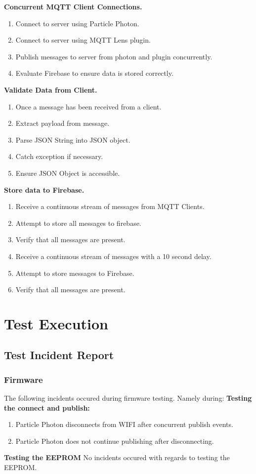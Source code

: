 \documentclass[a4paper,10pt]{article}
\begin{document}
		\textbf{Concurrent MQTT Client Connections.}
		\begin{enumerate}
			\item Connect to server using Particle Photon.
			\item Connect to server using MQTT Lens plugin.
			\item Publish messages to server from photon and plugin concurrently.
			\item Evaluate Firebase to ensure data is stored correctly.
		\end{enumerate}
		\textbf{Validate Data from Client.}
		\begin{enumerate}
			\item Once a message has been received from a client.
			\item Extract payload from message.
			\item Parse JSON String into JSON object.
			\item Catch exception if necessary.
			\item Ensure JSON Object is accessible.
		\end{enumerate}
		\textbf{Store data to Firebase.}
		\begin{enumerate}
			\item Receive a continuous stream of messages from MQTT Clients.
			\item Attempt to store all messages to firebase.
			\item Verify that all messages are present.
			\item Receive a continuous stream of messages with a 10 second delay.
			\item Attempt to store messages to Firebase.
			\item Verify that all messages are present.
		\end{enumerate}
			
	\section{Test Execution}
		\subsection{Test Incident Report}
			\subsubsection{Firmware}
			The following incidents occured during firmware testing. Namely during:
			\textbf{Testing the connect and publish:}
				\begin{enumerate}
					\item Particle Photon disconnects from WIFI after concurrent publish events.
					\item Particle Photon does not continue publishing after disconnecting.
				\end{enumerate}
			\textbf{Testing the EEPROM}
			No incidents occured with regards to testing the EEPROM.
\end{document}
